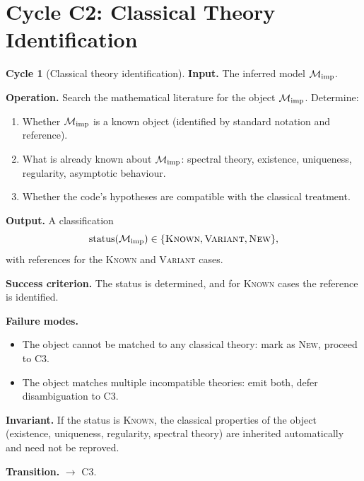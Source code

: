 \documentclass[11pt,a4paper]{article}
\theoremstyle{definition}
\newtheorem{cycle}{Cycle}[section]
\theoremstyle{plain}
\newcommand{\Mcal}{\mathcal{M}}
\begin{document}
\section{Cycle C2: Classical Theory Identification}
\label{sec:c2}

\begin{cycle}[Classical theory identification]\label{cy:c2}
\textbf{Input.} The inferred model $\Mcal_{\rm imp}$.

\medskip
\textbf{Operation.} Search the mathematical literature for the
object $\Mcal_{\rm imp}$. Determine:
\begin{enumerate}[label=\arabic*.]
  \item Whether $\Mcal_{\rm imp}$ is a known object (identified by
        standard notation and reference).
  \item What is already known about $\Mcal_{\rm imp}$: spectral
        theory, existence, uniqueness, regularity, asymptotic
        behaviour.
  \item Whether the code's hypotheses are compatible with the
        classical treatment.
\end{enumerate}

\medskip
\textbf{Output.} A classification
\[
  \text{status}(\Mcal_{\rm imp}) \in
  \{\textsc{Known}, \textsc{Variant}, \textsc{New}\},
\]
with references for the \textsc{Known} and \textsc{Variant} cases.

\medskip
\textbf{Success criterion.} The status is determined, and for
\textsc{Known} cases the reference is identified.

\medskip
\textbf{Failure modes.}
\begin{itemize}
  \item The object cannot be matched to any classical theory: mark
        as \textsc{New}, proceed to C3.
  \item The object matches multiple incompatible theories: emit
        both, defer disambiguation to C3.
\end{itemize}

\medskip
\textbf{Invariant.} If the status is \textsc{Known}, the classical
properties of the object (existence, uniqueness, regularity,
spectral theory) are inherited automatically and need not be
reproved.

\medskip
\textbf{Transition.} $\to$ C3.
\end{cycle}
\end{document}
